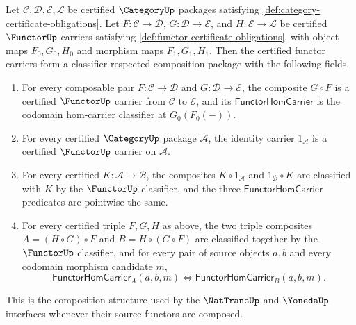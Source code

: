 \begin{theorem}
\label{thm:functor-composition-classifier-category-package}
Let $\mathcal C,\mathcal D,\mathcal E,\mathcal L$ be certified
$\CategoryUp$ packages satisfying \autoref{def:category-certificate-obligations}.
Let $F:\mathcal C\to\mathcal D$, $G:\mathcal D\to\mathcal E$, and
$H:\mathcal E\to\mathcal L$ be certified $\FunctorUp$ carriers satisfying
\autoref{def:functor-certificate-obligations}, with object maps
$F_0,G_0,H_0$ and morphism maps $F_1,G_1,H_1$. Then the certified
functor carriers form a classifier-respected composition package with the
following fields.
\begin{enumerate}
\item For every composable pair $F:\mathcal C\to\mathcal D$ and
$G:\mathcal D\to\mathcal E$, the composite $G\circ F$ is a certified
$\FunctorUp$ carrier from $\mathcal C$ to $\mathcal E$, and its
$\mathsf{FunctorHomCarrier}$ is the codomain hom-carrier classifier at
$G_0(F_0(-))$.
\item For every certified $\CategoryUp$ package $\mathcal A$, the identity
carrier $1_{\mathcal A}$ is a certified $\FunctorUp$ carrier on
$\mathcal A$.
\item For every certified $K:\mathcal A\to\mathcal B$, the composites
$K\circ 1_{\mathcal A}$ and $1_{\mathcal B}\circ K$ are classified with
$K$ by the $\FunctorUp$ classifier, and the three
$\mathsf{FunctorHomCarrier}$ predicates are pointwise the same.
\item For every certified triple $F,G,H$ as above, the two triple composites
$A=(H\circ G)\circ F$ and $B=H\circ(G\circ F)$ are classified together by
the $\FunctorUp$ classifier, and for every pair of source objects $a,b$ and
every codomain morphism candidate $m$,
$$
\mathsf{FunctorHomCarrier}_{A}(a,b,m)
\Longleftrightarrow
\mathsf{FunctorHomCarrier}_{B}(a,b,m).
$$
\end{enumerate}
This is the composition structure used by the $\NatTransUp$ and $\YonedaUp$
interfaces whenever their source functors are composed.
\end{theorem}
